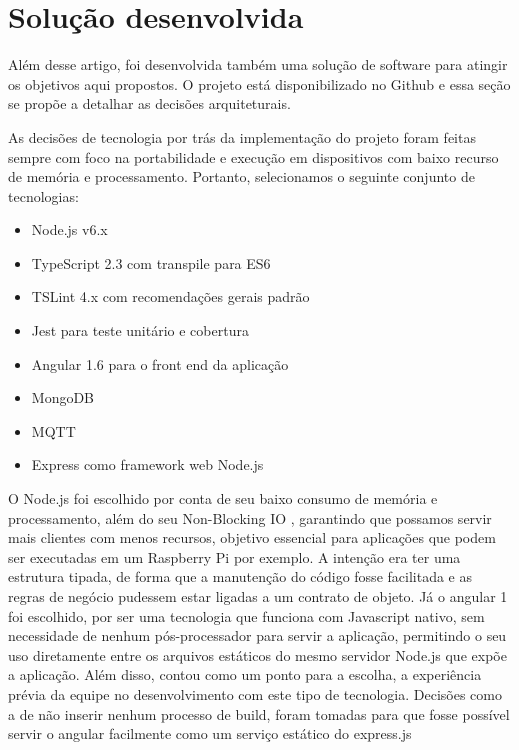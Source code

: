 \section{Solução desenvolvida}
\label{sec:iotGateway}

Além desse artigo, foi desenvolvida também uma solução de software para atingir os objetivos aqui propostos. O projeto está disponibilizado no Github \cite{IoTGatewayGithub} e essa seção se propõe a detalhar as decisões arquiteturais.

As decisões de tecnologia por trás da implementação do projeto foram feitas sempre com foco na portabilidade e execução em dispositivos com baixo recurso de memória e processamento. Portanto, selecionamos o seguinte conjunto de tecnologias:
\begin{itemize}
	\item Node.js v6.x \cite{NodeJS}
	\item TypeScript 2.3 com transpile para ES6 \cite{Typescript}
	\item TSLint 4.x com recomendações gerais padrão \cite{TSLint}
	\item Jest para teste unitário e cobertura \cite{Jest}
	\item Angular 1.6 para o front end da aplicação \cite{AngularJS}
	\item MongoDB \cite{MongoDB}
	\item MQTT \cite{Mqtt}
	\item Express como framework web Node.js \cite{ExpressJS}
\end{itemize}

O Node.js foi escolhido por conta de seu baixo consumo de memória e processamento, além do seu Non-Blocking IO \cite{NodeJSNonBlockingIO}, garantindo que possamos servir mais clientes com menos recursos, objetivo essencial para aplicações que podem ser executadas em um Raspberry Pi \cite{RaspberryPi} por exemplo. A intenção era ter uma estrutura tipada, de forma que a manutenção do código fosse facilitada e as regras de negócio pudessem estar ligadas a um contrato de objeto. Já o angular 1 foi escolhido, por ser uma tecnologia que funciona com Javascript nativo, sem necessidade de nenhum pós-processador para servir a aplicação, permitindo o seu uso diretamente entre os arquivos estáticos do mesmo servidor Node.js que expõe a aplicação. Além disso, contou como um ponto para a escolha, a experiência prévia da equipe no desenvolvimento com este tipo de tecnologia. Decisões como a de não inserir nenhum processo de build, foram tomadas para que fosse possível servir o angular facilmente como um serviço estático do express.js \cite{ExpressJS}

